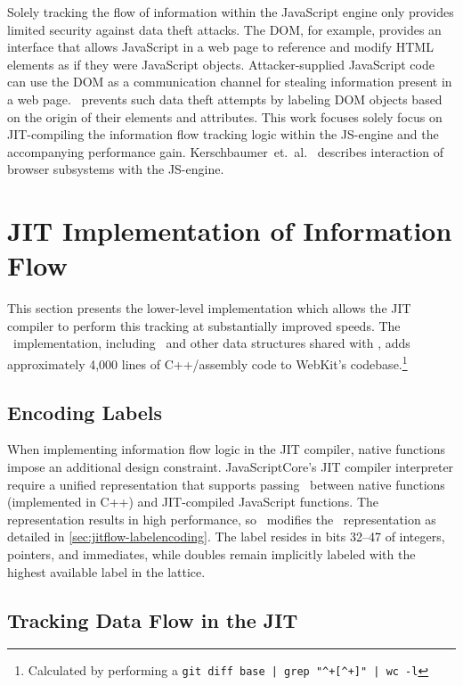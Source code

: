 Solely tracking the flow of information within the JavaScript engine only provides limited security against data theft attacks.
The DOM, for example, provides an interface that allows JavaScript in a web page to reference and modify HTML elements as if they were JavaScript objects.
Attacker-supplied JavaScript code can use the DOM as a communication channel for stealing information present in a web page.
\JitFlow\ prevents such data theft attempts by labeling DOM objects based on the origin of their elements and attributes.
This work focuses solely focus on JIT-compiling the information flow tracking logic within the JS-engine and the accompanying performance gain.
Kerschbaumer~et.~al.~\cite{kerschbaumer.etal+13} describes interaction of browser subsystems with the JS-engine.

\section{JIT Implementation of Information Flow}
\label{sec:jitflow-implementation}

This section presents the lower-level implementation which allows the JIT compiler to perform this tracking at substantially improved speeds.
The \JitFlow\ implementation, including \FlowLabelRegistry\ and other data structures shared with \FlowCore, adds approximately 4,000 lines of C++/assembly code to WebKit's codebase.\footnote{
Calculated by performing a \texttt{git diff base | grep "\textasciicircum+[\textasciicircum+]" | wc -l}}

\subsection{Encoding Labels}
\label{sec:jitlabelencoding}

When implementing information flow logic in the JIT compiler, native functions impose an additional design constraint.
JavaScriptCore's JIT compiler interpreter require a unified representation that supports passing \jsvalues\ between native functions (implemented in C++) and JIT-compiled JavaScript functions.
The  representation results in high performance, so \JitFlow\ modifies the \JSValue\ representation as detailed in \autoref{sec:jitflow-labelencoding}.
The label resides in bits 32--47 of integers, pointers, and immediates, while doubles remain implicitly labeled with the highest available label in the lattice.

\subsection{Tracking Data Flow in the JIT}
\label{sec:jitdataflow}


